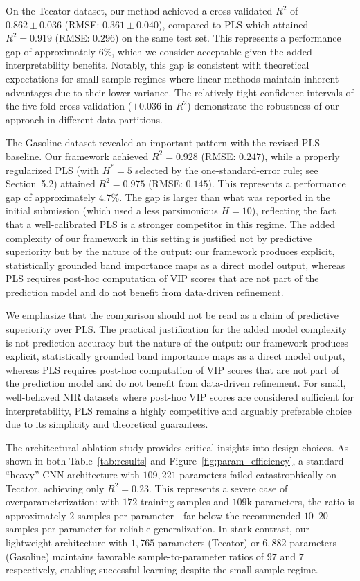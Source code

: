 \documentclass[preprint,12pt]{elsarticle}
\begin{document}
On the Tecator dataset, our method achieved a cross-validated $R^2$ of $0.862\pm0.036$ (RMSE: $0.361\pm0.040$), compared to PLS which attained $R^2=0.919$ (RMSE: $0.296$) on the same test set. This represents a performance gap of approximately $6$\%, which we consider acceptable given the added interpretability benefits. Notably, this gap is consistent with theoretical expectations for small-sample regimes where linear methods maintain inherent advantages due to their lower variance. The relatively tight confidence intervals of the five-fold cross-validation ($\pm0.036$ in $R^2$) demonstrate the robustness of our approach in different data partitions.

The Gasoline dataset revealed an important pattern with the revised PLS baseline. Our framework achieved $R^2=0.928$ (RMSE: $0.247$), while a properly regularized PLS (with $H^*=5$ selected by the one-standard-error rule; see Section~5.2) attained $R^2=0.975$ (RMSE: $0.145$). This represents a performance gap of approximately $4.7$\%. The gap is larger than what was reported in the initial submission (which used a less parsimonious $H=10$), reflecting the fact that a well-calibrated PLS is a stronger competitor in this regime. The added complexity of our framework in this setting is justified not by predictive superiority but by the nature of the output: our framework produces explicit, statistically grounded band importance maps as a direct model output, whereas PLS requires post-hoc computation of VIP scores that are not part of the prediction model and do not benefit from data-driven refinement.

We emphasize that the comparison should not be read as a claim of predictive superiority over PLS. The practical justification for the added model complexity is not prediction accuracy but the nature of the output: our framework produces explicit, statistically grounded band importance maps as a direct model output, whereas PLS requires post-hoc computation of VIP scores that are not part of the prediction model and do not benefit from data-driven refinement. For small, well-behaved NIR datasets where post-hoc VIP scores are considered sufficient for interpretability, PLS remains a highly competitive and arguably preferable choice due to its simplicity and theoretical guarantees.

The architectural ablation study provides critical insights into design choices. As shown in both Table~\ref{tab:results} and Figure~\ref{fig:param_efficiency}, a standard ``heavy'' CNN architecture with $109,221$ parameters failed catastrophically on Tecator, achieving only $R^2=0.23$. This represents a severe case of overparameterization: with $172$ training samples and $109$k parameters, the ratio is approximately $2$ samples per parameter---far below the recommended $10$--$20$ samples per parameter for reliable generalization. In stark contrast, our lightweight architecture with $1,765$ parameters (Tecator) or $6,882$ parameters (Gasoline) maintains favorable sample-to-parameter ratios of $97$ and $7$ respectively, enabling successful learning despite the small sample regime.
\end{document}

